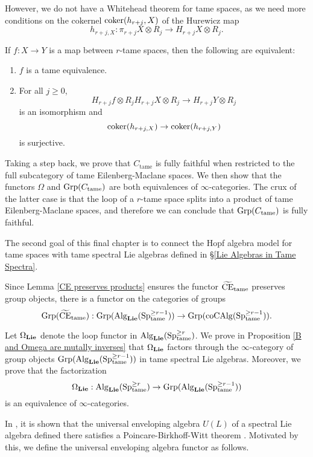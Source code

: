 	However, we do not have a Whitehead theorem for tame spaces, as we need more conditions on the cokernel $\operatorname{coker}(h_{r+j}, X)$ of the Hurewicz map
	$$
	h_{r+j,X}: \pi_{r+j}X\otimes R_j \to 
	H_{r+j}X\otimes R_j.
	$$
	\begin{proposition}
	\cite[Proposition 1.1]{Felix-LemaireII}
	If $f:X \to Y$ is a map between $r$-tame spaces, then the following are equivalent:
\begin{enumerate}
    \item $f$ is a tame equivalence.
    \item For all $j\geq 0$, 
    $$
    H_{r+j}f \otimes R_j
    H_{r+j}X \otimes R_j
	\to 
	H_{r+j}Y \otimes R_j
    $$
    is an isomorphism and 
    $$
    \operatorname{coker}(h_{r+j,X}) \to \operatorname{coker}(h_{r+j,Y})
    $$
    is surjective.
\end{enumerate}
	\end{proposition}
	
	Taking a step back, we prove that $C_{\operatorname{tame}}$ is fully faithful when restricted to the full subcategory of tame Eilenberg-Maclane spaces.
We then show that the functors $\Omega$ and $\operatorname{Grp}(C_{\operatorname{tame}})$ are both equivalences of $\infty$-categories. 
The crux of the latter case is that the loop of a $r$-tame space splits into a product of tame Eilenberg-Maclane spaces, and therefore we can conclude that $\operatorname{Grp}(C_{\operatorname{tame}})$ is fully faithful.

The second goal of this final chapter is to connect the Hopf algebra model for tame spaces with tame spectral Lie algebras defined in \S \ref{Lie Algebras in Tame Spectra}.

Since Lemma \ref{CE preserves products} ensures the functor $\widetilde{\operatorname{CE}}_{\operatorname{\operatorname{tame}}}$ preserves group objects, there is a functor on the categories of groups
\[
	\operatorname{Grp}(\widetilde{\operatorname{CE}}_{\operatorname{\operatorname{tame}}}):
	\operatorname{Grp}(\operatorname{Alg}_{\mathbf{Lie}}(\operatorname{Sp}^{\geq r-1}_{\operatorname{\operatorname{tame}}}))
	\to 
	\operatorname{Grp}(\operatorname{coCAlg}(\operatorname{Sp}^{\geq r-1}_{\operatorname{\operatorname{tame}}})).
\]

Let $\Omega_{\mathbf{Lie}}$ denote the loop functor in $\operatorname{Alg}_{\mathbf{Lie}}(\operatorname{Sp}^{\geq r}_{\operatorname{\operatorname{tame}}}) $. We prove in Proposition \ref{B and Omega are mutally inverses} that $\Omega_{\mathbf{Lie}}$ factors through the $\infty$-category of group objects $\operatorname{Grp}(\operatorname{Alg}_{\mathbf{Lie}}(\operatorname{Sp}^{\geq r-1}_{\operatorname{\operatorname{tame}}}))$ in tame spectral Lie algebras. Moreover, we prove that the factorization
$$
\Omega_{\mathbf{Lie}}: \operatorname{Alg}_{\mathbf{Lie}}(\operatorname{Sp}^{\geq r}_{\operatorname{\operatorname{tame}}})
\to 
\operatorname{Grp}(\operatorname{Alg}_{\mathbf{Lie}}(\operatorname{Sp}^{\geq r-1}_{\operatorname{\operatorname{tame}}}))
$$
is an equivalence of $\infty$-categories.

In \cite{KnudsenHEA}, it is shown that the universal enveloping algebra $U(L)$ of a spectral Lie algebra defined there satisfies a Poincare-Birkhoff-Witt theorem
\cite[Theorem B]{KnudsenHEA}.
Motivated by this, we define the universal enveloping algebra functor as follows.

